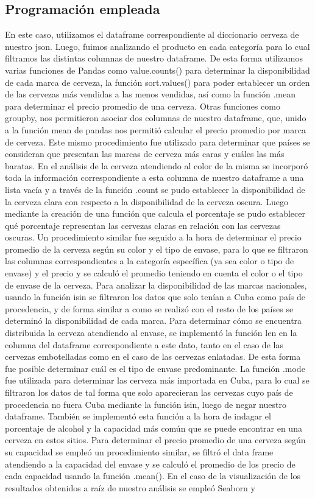 \documentclass[a4paper,12pt]{article}
\begin{document}
		\subsection{Programación empleada}
	     En este caso, utilizamos el dataframe correspondiente al diccionario cerveza de nuestro json. Luego, fuimos analizando el producto en cada categoría para lo cual filtramos las distintas columnas de nuestro dataframe. De esta forma utilizamos varias funciones de Pandas como value.counts() para determinar la disponibilidad de cada marca de cerveza, la función sort.values() para poder establecer un orden de las cervezas más vendidas a las menos vendidas, así como la función .mean para determinar el precio promedio de una cerveza. Otras funciones como groupby, nos permitieron asociar dos columnas de nuestro dataframe, que, unido a la función mean de pandas nos permitió calcular el precio promedio por marca de cerveza. Este mismo procedimiento fue utilizado para determinar que países se consideran que presentan las marcas de cerveza más caras y cuáles las más baratas. En el análisis de la cerveza atendiendo al color de la misma se incorporó toda la información correspondiente a esta columna de nuestro dataframe a una lista vacía y a través de la función .count se pudo establecer la disponibilidad de la cerveza clara con respecto a la disponibilidad de la cerveza oscura. Luego mediante la creación de una función que calcula el porcentaje se pudo establecer qué porcentaje representan las cervezas claras en relación con las cervezas oscuras. Un procedimiento similar fue seguido a la hora de determinar el precio promedio de la cerveza según su color y el tipo de envase, para lo que se filtraron las columnas correspondientes a la categoría específica (ya sea color o tipo de envase) y el precio y se calculó el promedio teniendo en cuenta el color o el tipo de envase de la cerveza. Para analizar la disponibilidad de las marcas nacionales, usando la función isin se filtraron los datos que solo tenían a Cuba como país de procedencia, y de forma similar a como se realizó con el resto de los países se determinó la disponibilidad de cada marca. Para determinar cómo se encuentra distribuida la cerveza atendiendo al envase, se implementó la función len en la columna del dataframe correspondiente a este dato, tanto en el caso de las cervezas embotelladas como en el caso de las cervezas enlatadas. De esta forma fue posible determinar cuál es el tipo de envase predominante. La función .mode fue utilizada para determinar las cerveza más importada en Cuba, para lo cual se filtraron los datos de tal forma que solo aparecieran las cervezas cuyo país de procedencia no fuera Cuba mediante la función isin, luego de negar nuestro dataframe. También se implementó esta función a la hora de indagar el porcentaje de alcohol y la capacidad más común que se puede encontrar en una cerveza en estos sitios. Para determinar el precio promedio de una cerveza según su capacidad se empleó un procedimiento similar, se filtró el data frame atendiendo a la capacidad del envase y se calculó el promedio de los precio de cada capacidad usando la función .mean(). En el caso de la visualización de los resultados obtenidos a raíz de nuestro análisis se empleó Seaborn y 
\end{document}
